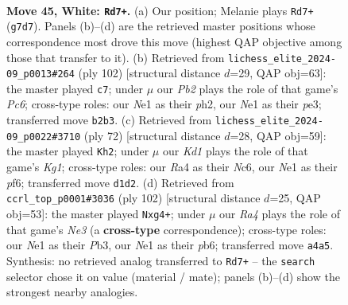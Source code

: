 \documentclass[11pt]{article}
\begin{document}
\clearpage

\begin{figure}[p]\centering
\begin{subfigure}{0.46\textwidth}\centering
\resizebox{\linewidth}{!}{%
\newchessgame
\chessboard[
  setfen={8/p5R1/8/2pk3P/R3pp2/8/1P6/3KN2r w - - 2 45},
  showmover=false,
  pgfstyle=straightmove, color=movearrow, markmove={g7-d7}
]}
\caption{}
\end{subfigure}\hfill
\begin{subfigure}{0.46\textwidth}\centering
\resizebox{\linewidth}{!}{%
\newchessgame
\chessboard[
  setfen={8/6p1/2P3k1/1r6/1P5r/2K1p3/4R2p/7R w - - 0 52},
  showmover=false,
  pgfstyle=straightmove, color=movearrow, markmove={c6-c7}
]}
\caption{}
\end{subfigure}
\\[4pt]
\begin{subfigure}{0.46\textwidth}\centering
\resizebox{\linewidth}{!}{%
\newchessgame
\chessboard[
  setfen={8/5kpp/2N2p2/ppn2R2/8/7P/2r3P1/6K1 w - - 2 37},
  showmover=false,
  pgfstyle=straightmove, color=movearrow, markmove={g1-h2}
]}
\caption{}
\end{subfigure}\hfill
\begin{subfigure}{0.46\textwidth}\centering
\resizebox{\linewidth}{!}{%
\newchessgame
\chessboard[
  setfen={8/p7/1p3k2/1R4p1/4K1p1/1P2N3/1r6/8 w - - 0 52},
  showmover=false,
  pgfstyle=straightmove, color=movearrow, markmove={e3-g4}
]}
\caption{}
\end{subfigure}
\caption{\textbf{Move 45, White: \texttt{Rd7+}.} (a) Our position; Melanie plays \texttt{Rd7+} (\texttt{g7d7}). Panels (b)--(d) are the retrieved master positions whose correspondence most drove this move (highest QAP objective among those that transfer to it). (b) Retrieved from \texttt{lichess\_elite\_2024-09\_p0013\#264} (ply 102) [structural distance $d$=29, QAP obj=63]: the master played \texttt{c7}; under $\mu$ our \emph{Pb2} plays the role of that game's \emph{Pc6}; cross-type roles: our \emph{N}e1 as their \emph{p}h2, our \emph{N}e1 as their \emph{p}e3; transferred move \texttt{b2b3}. (c) Retrieved from \texttt{lichess\_elite\_2024-09\_p0022\#3710} (ply 72) [structural distance $d$=28, QAP obj=59]: the master played \texttt{Kh2}; under $\mu$ our \emph{Kd1} plays the role of that game's \emph{Kg1}; cross-type roles: our \emph{R}a4 as their \emph{N}c6, our \emph{N}e1 as their \emph{p}f6; transferred move \texttt{d1d2}. (d) Retrieved from \texttt{ccrl\_top\_p0001\#3036} (ply 102) [structural distance $d$=25, QAP obj=53]: the master played \texttt{Nxg4+}; under $\mu$ our \emph{Ra4} plays the role of that game's \emph{Ne3} (a \textbf{cross-type} correspondence); cross-type roles: our \emph{N}e1 as their \emph{P}b3, our \emph{N}e1 as their \emph{p}b6; transferred move \texttt{a4a5}. Synthesis: no retrieved analog transferred to \texttt{Rd7+} -- the \texttt{search} selector chose it on value (material / mate); panels (b)--(d) show the strongest nearby analogies.}
\label{fig:thought-m88}
\end{figure}
\end{document}
